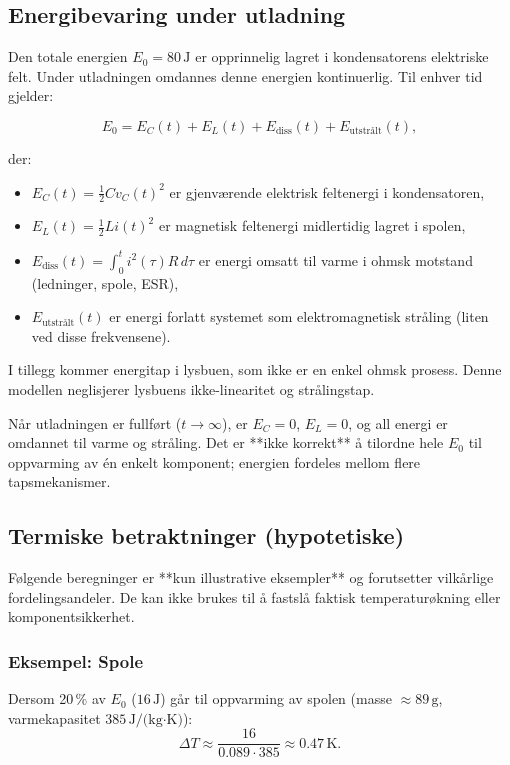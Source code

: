 \documentclass{article}
\begin{document}
\subsection{Energibevaring under utladning}
Den totale energien $E_0 = 80\,\text{J}$ er opprinnelig lagret i kondensatorens elektriske felt. Under utladningen omdannes denne energien kontinuerlig. Til enhver tid gjelder:

\begin{equation}
E_0 = E_C(t) + E_L(t) + E_{\text{diss}}(t) + E_{\text{utstrålt}}(t),
\end{equation}

der:
\begin{itemize}
\item $E_C(t) = \frac{1}{2} C v_C(t)^2$ er gjenværende elektrisk feltenergi i kondensatoren,
\item $E_L(t) = \frac{1}{2} L i(t)^2$ er magnetisk feltenergi midlertidig lagret i spolen,
\item $E_{\text{diss}}(t) = \int_0^t i^2(\tau) R\,d\tau$ er energi omsatt til varme i ohmsk motstand (ledninger, spole, ESR),
\item $E_{\text{utstrålt}}(t)$ er energi forlatt systemet som elektromagnetisk stråling (liten ved disse frekvensene).
\end{itemize}

I tillegg kommer energitap i lysbuen, som ikke er en enkel ohmsk prosess. Denne modellen neglisjerer lysbuens ikke-linearitet og strålingstap.

Når utladningen er fullført ($t \to \infty$), er $E_C = 0$, $E_L = 0$, og all energi er omdannet til varme og stråling. Det er **ikke korrekt** å tilordne hele $E_0$ til oppvarming av én enkelt komponent; energien fordeles mellom flere tapsmekanismer.

\subsection{Termiske betraktninger (hypotetiske)}
Følgende beregninger er **kun illustrative eksempler** og forutsetter vilkårlige fordelingsandeler. De kan ikke brukes til å fastslå faktisk temperaturøkning eller komponentsikkerhet.

\subsubsection{Eksempel: Spole}
Dersom 20\,\% av $E_0$ ($16\,\text{J}$) går til oppvarming av spolen (masse $\approx 89\,\text{g}$, varmekapasitet $385\,\text{J/(kg·K)}$):
\begin{equation}
\Delta T \approx \frac{16}{0.089 \cdot 385} \approx 0.47\,\text{K}.
\end{equation}
\end{document}
